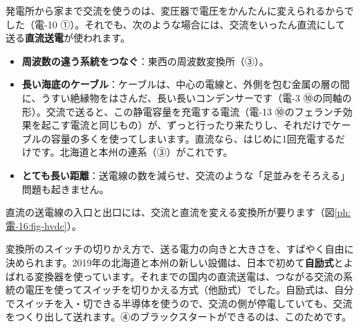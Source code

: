 \leavevmode\label{ph:電-16:sec6}発電所から家まで交流を使うのは、変圧器で電圧をかんたんに変えられるからでした（電-10 ①）。それでも、次のような場合には、交流をいったん直流にして送る\textbf{直流送電}が使われます。
\begin{itemize}[leftmargin=1.2\zw, itemsep=2pt, topsep=2pt, label={\color{bkTheme}●}]
\item \textbf{周波数の違う系統をつなぐ}：東西の周波数変換所（③）。
\item \textbf{長い海底のケーブル}：ケーブルは、中心の電線と、外側を包む金属の層の間に、うすい絶縁物をはさんだ、長い長いコンデンサーです（電-3 ⑩の同軸の形）。交流で送ると、この静電容量を充電する電流（電-13 ⑩のフェランチ効果を起こす電流と同じもの）が、ずっと行ったり来たりし、それだけでケーブルの容量の多くを使ってしまいます。直流なら、はじめに1回充電するだけです。北海道と本州の連系（③）がこれです。
\item \textbf{とても長い距離}：送電線の数を減らせ、交流のような「足並みをそろえる」問題も起きません。
\end{itemize}
直流の送電線の入口と出口には、交流と直流を変える変換所が要ります（図\ref{ph:電-16:fig-hvdc}）。
\begin{bkfigure}
\label{ph:電-16:fig-hvdc}
\end{bkfigure}
変換所のスイッチの切りかえ方で、送る電力の向きと大きさを、すばやく自由に決められます。2019年の北海道と本州の新しい設備は、日本で初めて\textbf{自励式}とよばれる変換器を使っています。それまでの国内の直流送電は、つながる交流の系統の電圧を使ってスイッチを切りかえる方式（他励式）でした。自励式は、自分でスイッチを入・切できる半導体を使うので、交流の側が停電していても、交流をつくり出して送れます。④のブラックスタートができるのは、このためです。

